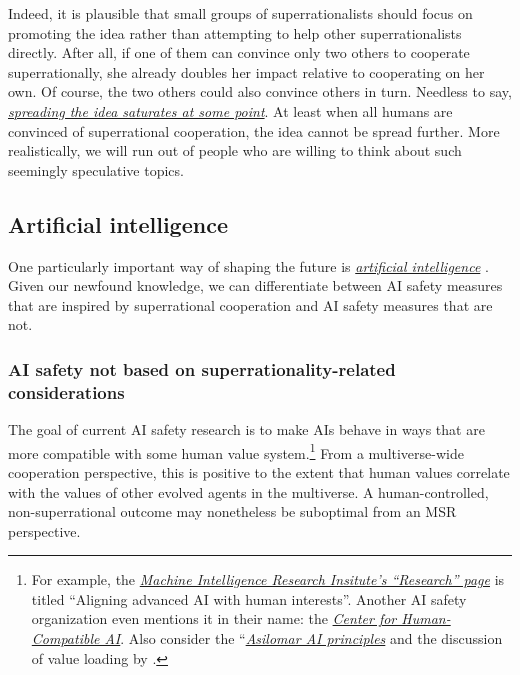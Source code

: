 Indeed, it is plausible that small groups of superrationalists should
focus on promoting the idea rather than attempting to help other
superrationalists directly. After all, if one of them can convince only
two others to cooperate superrationally, she already doubles her impact
relative to cooperating on her own. Of course, the two others could also
convince others in turn. Needless to say,
\href{https://en.wikipedia.org/wiki/Logistic_function\#In_ecology:_modeling_population_growth}{\emph{spreading
the idea saturates at some point}}. At least when all humans are
convinced of superrational cooperation, the idea cannot be spread
further. More realistically, we will run out of people who are willing
to think about such seemingly speculative topics.

\hypertarget{artificial-intelligence}{\subsection{Artificial
intelligence}\label{artificial-intelligence}}

One particularly important way of shaping the future is
\href{https://foundational-research.org/why-altruists-should-focus-on-artificial-intelligence/}{\emph{artificial
intelligence}} \parencite{Bostrom2014-pc}. Given our
newfound knowledge, we can differentiate between AI safety measures that
are inspired by superrational cooperation and AI safety measures that
are not.

\subsubsection{AI safety not based on superrationality-related
considerations}\label{ai-safety-not-based-on-superrationality-related-considerations}

The goal of current AI safety research is to make AIs behave in ways
that are more compatible with some human value system.\footnote{For
  example, the \href{https://intelligence.org/research/}{\emph{Machine
  Intelligence Research Insitute's ``Research'' page}} is titled
  ``Aligning advanced AI with human interests''. Another AI safety
  organization even mentions it in their name: the
  \href{http://humancompatible.ai/about}{\emph{Center for
  Human-Compatible AI}}. Also consider the
  ``\href{https://futureoflife.org/ai-principles/}{\emph{Asilomar AI
  principles}} and the discussion of value loading by
  \parencite{Bostrom2014-pc}.} From a multiverse-wide
cooperation perspective, this is positive to the extent that human
values correlate with the values of other evolved agents in the
multiverse. A human-controlled, non-superrational outcome may
nonetheless be suboptimal from an MSR perspective.

